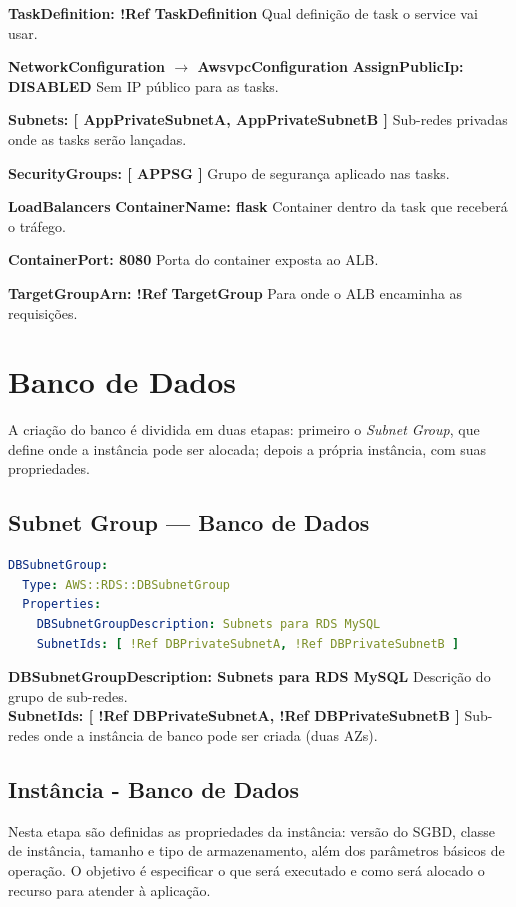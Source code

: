 \textbf{TaskDefinition: !Ref TaskDefinition} Qual definição de task o service vai usar.

\textbf{NetworkConfiguration \(\rightarrow\) AwsvpcConfiguration}
\quad \textbf{AssignPublicIp: DISABLED} Sem IP público para as tasks.

\quad \textbf{Subnets: [ AppPrivateSubnetA, AppPrivateSubnetB ]} Sub-redes privadas onde as tasks serão lançadas.

\quad \textbf{SecurityGroups: [ APPSG ]} Grupo de segurança aplicado nas tasks.

\textbf{LoadBalancers}
\quad \textbf{ContainerName: flask} Container dentro da task que receberá o tráfego.

\quad \textbf{ContainerPort: 8080} Porta do container exposta ao ALB.

\quad \textbf{TargetGroupArn: !Ref TargetGroup} Para onde o ALB encaminha as requisições.


\section{Banco de Dados}
A criação do banco é dividida em duas etapas: primeiro o \textit{Subnet Group}, que define onde a instância pode ser alocada; depois a própria instância, com suas propriedades.

\subsection{Subnet Group — Banco de Dados}

\begin{lstlisting}[language=YAML]
DBSubnetGroup:
  Type: AWS::RDS::DBSubnetGroup
  Properties:
    DBSubnetGroupDescription: Subnets para RDS MySQL
    SubnetIds: [ !Ref DBPrivateSubnetA, !Ref DBPrivateSubnetB ]
\end{lstlisting}

\textbf{DBSubnetGroupDescription: Subnets para RDS MySQL} Descrição do grupo de sub-redes.\\
\textbf{SubnetIds: [ !Ref DBPrivateSubnetA, !Ref DBPrivateSubnetB ]} Sub-redes onde a instância de banco pode ser criada (duas AZs).

\subsection{Instância - Banco de Dados}
Nesta etapa são definidas as propriedades da instância: versão do SGBD, classe de instância, tamanho e tipo de armazenamento, além dos parâmetros básicos de operação. O objetivo é especificar o que será executado e como será alocado o recurso para atender à aplicação.\\

